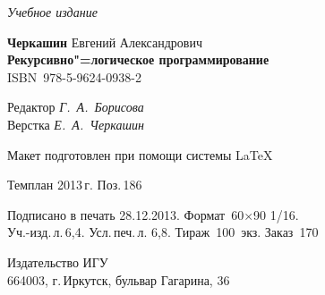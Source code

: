 \documentclass[12pt, openany, twoside, final]{extbook} %
\begin{document}
\vfill\vfill\vfill\vfill

\hfill{}{\small\itshape Учебное издание}
\vspace{4ex}
\begin{center}
{\small\textbf{Черкашин} Евгений Александрович\\[1em]}
{\bfseries Рекурсивно"=логическое программирование}\\[1em]
ISBN~978-5-9624-0938-2
\vfill

\small
Редактор \textit{Г.~А.~Борисова}\\
Верстка \textit{Е.~А.~Черкашин}

\vfill{}
{\small Макет подготовлен при помощи системы \LaTeX\\\mbox{}}
\vfill{}

Темплан 2013\,{}г. Поз.\,{}186

\end{center}
\begin{center}\small
\noindent Подписано в печать 28.12.2013.
Формат~60$\times$90 1/16.\\  %
Уч.-изд.\,{}л.\,{}6,4. Усл.\,{}печ.\,{}л. 6,8. Тираж~100~экз. Заказ~170
\end{center}
\vspace{1           ex}
\begin{center}\small
Издательство ИГУ\\{}
664003, г.\,{}Иркутск, бульвар Гагарина, 36
\end{center}
\end{document}
